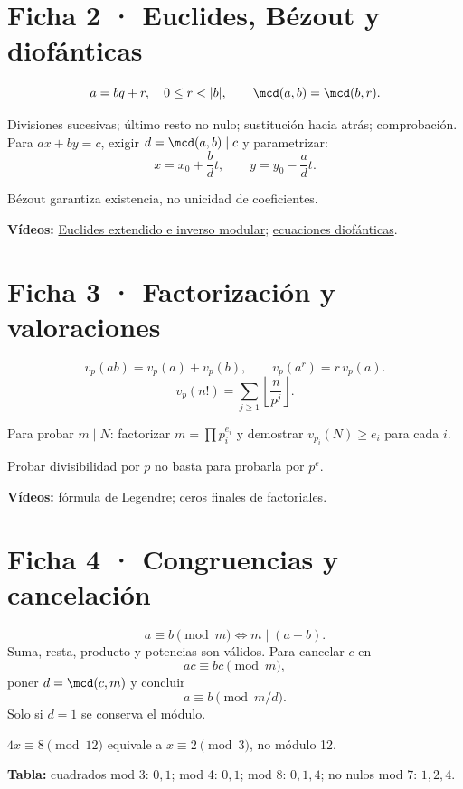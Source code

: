 \documentclass[10pt,a4paper,openany]{report}
\begin{document}
\section*{Ficha 2 · Euclides, Bézout y diofánticas}
\[
a=bq+r,\quad0\le r<|b|,\qquad \mcd(a,b)=\mcd(b,r).
\]
\begin{procedimiento}
Divisiones sucesivas; último resto no nulo; sustitución hacia atrás; comprobación. Para $ax+by=c$, exigir $d=\mcd(a,b)\mid c$ y parametrizar:
\[
x=x_0+\frac bd t,\qquad y=y_0-\frac ad t.
\]
\end{procedimiento}
\begin{alerta}Bézout garantiza existencia, no unicidad de coeficientes.\end{alerta}
\textbf{Vídeos:} \href{https://www.youtube.com/watch?v=09nDdgiQ-fs}{Euclides extendido e inverso modular}; \href{https://www.youtube.com/watch?v=k6-bbwRISOo}{ecuaciones diofánticas}.
\clearpage

\section*{Ficha 3 · Factorización y valoraciones}
\[
v_p(ab)=v_p(a)+v_p(b),\qquad v_p(a^r)=r\,v_p(a).
\]
\[
v_p(n!)=\sum_{j\ge1}\left\lfloor\frac{n}{p^j}\right\rfloor.
\]
\begin{ruta}
Para probar $m\mid N$: factorizar $m=\prod p_i^{e_i}$ y demostrar $v_{p_i}(N)\ge e_i$ para cada $i$.
\end{ruta}
\begin{alerta}Probar divisibilidad por $p$ no basta para probarla por $p^e$.\end{alerta}
\textbf{Vídeos:} \href{https://www.youtube.com/watch?v=AIAYP3uKoyg}{fórmula de Legendre}; \href{https://www.youtube.com/watch?v=AAL2lu_Ov-8}{ceros finales de factoriales}.
\clearpage

\section*{Ficha 4 · Congruencias y cancelación}
\[
a\equiv b\pmod m\Longleftrightarrow m\mid(a-b).
\]
Suma, resta, producto y potencias son válidos. Para cancelar $c$ en
\[
ac\equiv bc\pmod m,
\]
poner $d=\mcd(c,m)$ y concluir
\[
a\equiv b\pmod{m/d}.
\]
Solo si $d=1$ se conserva el módulo.
\begin{alerta}$4x\equiv8\pmod{12}$ equivale a $x\equiv2\pmod3$, no módulo 12.\end{alerta}
\textbf{Tabla:} cuadrados mod 3: $0,1$; mod 4: $0,1$; mod 8: $0,1,4$; no nulos mod 7: $1,2,4$.
\clearpage
\end{document}
